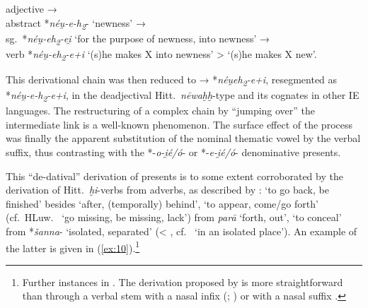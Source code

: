 \documentclass[output=paper,colorlinks,citecolor=brown]{langscibook}
\begin{document}
\newpage
\begin{exe}
   \ex adjective   
→\\ abstract *\textit{néu̯-e-h\textsubscript{2}}- ‘newness’ →\\  sg.\ *\textit{néu̯-eh\textsubscript{2}-ei̯} ‘for the purpose of newness, into newness’ 
→\\ verb *\textit{néu̯-eh\textsubscript{2}-e+i} ‘(s)he makes X into newness’ > ‘(s)he makes X new’. \label{ex:9}
\end{exe}

This derivational chain was then reduced to  → *\textit{néu̯eh\textsubscript{2}-e+i}, resegmented as *\textit{néu̯-e-h\textsubscript{2}-e+i}, in the deadjectival  Hitt.\ \textit{nēwaḫḫ}-type and its cognates in other IE languages. The restructuring of a complex chain by “jumping over” the intermediate link is a well-known phenomenon. The surface effect of the process was finally the apparent substitution of the nominal thematic vowel by the verbal suffix, thus contrasting with the *-\textit{o-i̯é/ó}- or *-\textit{e-i̯é/ó}- denominative presents. 

This “de-datival”  derivation of  presents is to some extent corroborated by the derivation of Hitt.\ \textit{ḫi}-verbs  from adverbs, as described by \citet{Melchert2009}:  ‘to go back, be finished’ besides  ‘after, (temporally) behind’,  ‘to appear, come/go forth’ (cf.\  HLuw.\   ‘go missing, be missing, lack’) from \textit{parā} ‘forth, out’,  ‘to conceal’ from *\textit{šanna}- ‘isolated, separated’ (< , cf.\   ‘in an isolated place’). An example of the latter is given in (\ref{ex:10}).\footnote{Further instances in \citealt[111--113]{Puhvel2017}. The derivation proposed by \citet[336--337]{Melchert2009} is more straightforward than through a verbal stem with a nasal infix (\citealt[159--160]{Oettinger1979}; \citealt[719]{Kloekhorst2008}) or with a nasal suffix \citep[116]{Puhvel2017}.}  
\end{document}
